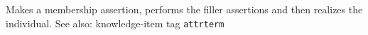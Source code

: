    

Makes a membership assertion, performs the filler assertions and then
realizes the individual.
See also: knowledge-item tag {\tt attrterm}

